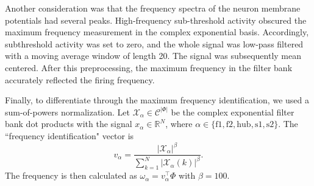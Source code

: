 \documentclass[11pt]{article}
\begin{document}


Another consideration was that the frequency spectra of the neuron membrane potentials had several peaks.  High-frequency sub-threshold activity obscured the maximum frequency measurement in the complex exponential basis.  Accordingly, subthreshold activity was set to zero, and the whole signal was low-pass filtered with a moving average window of length 20.  The signal was subsequently mean centered.  After this preprocessing, the maximum frequency in the filter bank accurately reflected the firing frequency.

Finally, to differentiate through the maximum frequency identification, we used a sum-of-powers normalization.  Let $\mathcal{X}_\alpha \in \mathcal{C}^{|\Phi|}$ be the complex exponential filter bank dot products with the signal $x_\alpha \in \mathbb{R}^{N}$, where $\alpha \in \{ \text{f1}, \text{f2}, \text{hub}, \text{s1}, \text{s2} \}$.  The ``frequency identification" vector is 
\begin{equation}
v_\alpha = \frac{|\mathcal{X}_\alpha|^\beta}{\sum_{k=1}^N |\mathcal{X}_\alpha(k)|^\beta}.
\end{equation}
The frequency is then calculated as $\omega_\alpha = v_\alpha^\top \Phi$ with $\beta = 100$.
\end{document}
